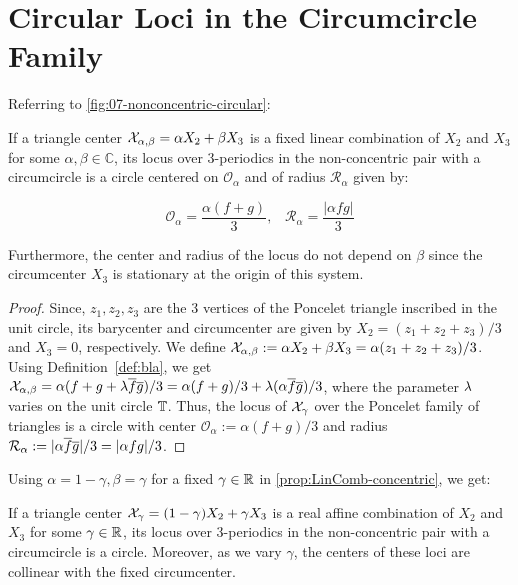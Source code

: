 \section{Circular Loci in the Circumcircle Family}
\label{sec:07-circular}

Referring to \cref{fig:07-nonconcentric-circular}:

\begin{proposition}
If a triangle center $\mathcal{X}_{\alpha,\beta}=\alpha X_2+ \beta X_3$ is a fixed linear combination of $X_2$ and $X_3$ for some $\alpha,\beta\in\mathbb{C}$, its locus over 3-periodics in the non-concentric pair with a circumcircle is a circle centered on $\mathcal{O}_\alpha$ and of radius $\mathcal{R}_\alpha$ given by:

\[ \mathcal{O}_\alpha = \frac{\alpha(f+g)}{3},\;\;\; \mathcal{R}_\alpha =\frac{|\alpha f g|}{3}\]
\label{prop:LinComb-concentric}

Furthermore, the center and radius of the locus do not depend on $\beta$ since the circumcenter $X_3$ is stationary at the origin of this system.
\end{proposition}

\begin{proof}
Since, $z_1,z_2,z_3$ are the 3 vertices of the Poncelet triangle inscribed in the unit circle, its barycenter and circumcenter are given by $X_2=(z_1+z_2+z_3)/3$ and $X_3=0$, respectively. We define $\mathcal{X}_{\alpha,\beta}:=\alpha X_2+ \beta X_3=\alpha (z_1+z_2+z_3)/3$. Using Definition~\ref{def:bla}, we get $\mathcal{X}_{\alpha,\beta}=\alpha(f+g+\lambda \overline{f}\overline{g})/3=\alpha(f+g)/3+\lambda(\alpha \overline{f}\overline{g})/3$, where the parameter $\lambda$ varies on the unit circle $\mathbb{T}$. Thus, the locus of $\mathcal{X}_{\gamma}$ over the Poncelet family of triangles is a circle with center $\mathcal{O}_{\alpha}:=\alpha(f+g)/3$ and radius $\mathcal{R}_{\alpha}:=|\alpha \overline{f}\overline{g}|/3=|\alpha f g|/3$.
\end{proof}

Using $\alpha=1-\gamma, \beta=\gamma$ for a fixed $\gamma\in\mathbb{R}$ in   \cref{prop:LinComb-concentric}, we get:

\begin{corollary}
 If a triangle center $\mathcal{X}_\gamma=(1-\gamma) X_2+ \gamma X_3$ is a real affine combination of $X_2$ and $X_3$ for some $\gamma\in\mathbb{R}$, its locus over 3-periodics in the non-concentric pair with a circumcircle is a circle. Moreover, as we vary $\gamma$, the centers of these loci are collinear with the fixed circumcenter.
 \label{cor:gamma-with-circumcircle}
\end{corollary}

